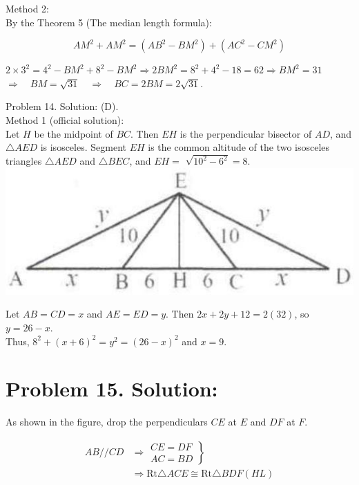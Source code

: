 \documentclass[10pt]{article}
\begin{document}
Method 2:\\
By the Theorem 5 (The median length formula):

\[
A M^{2}+A M^{2}=\left(A B^{2}-B M^{2}\right)+\left(A C^{2}-C M^{2}\right)
\]

\(2 \times 3^{2}=4^{2}-B M^{2}+8^{2}-B M^{2} \Rightarrow 2 B M^{2}=8^{2}+4^{2}-18=62 \Rightarrow B M^{2}=31\) \(\Rightarrow \quad B M=\sqrt{31} \quad \Rightarrow \quad B C=2 B M=2 \sqrt{31}\).

Problem 14. Solution: (D).\\
Method 1 (official solution):\\
Let \(H\) be the midpoint of \(B C\). Then \(E H\) is the perpendicular bisector of \(A D\), and \(\triangle A E D\) is isosceles. Segment \(E H\) is the common altitude of the two isosceles triangles \(\triangle A E D\) and \(\triangle B E C\), and \(E H=\) \(\sqrt{10^{2}-6^{2}}=8\).\\
\includegraphics[max width=\textwidth, center]{2025_04_17_97bc1f7e44d93c271a88g-097(2)}

Let \(A B=C D=x\) and \(A E=E D=y\). Then \(2 x+2 y+12=2(32)\), so \(y=26-x\).\\
Thus, \(8^{2}+(x+6)^{2}=y^{2}=(26-x)^{2}\) and \(x=9\).

\section*{Problem 15. Solution:}
As shown in the figure, drop the perpendiculars \(C E\) at \(E\) and \(D F\) at \(F\).

\[
\begin{aligned}
A B / / C D & \left.\Rightarrow \begin{array}{l}
C E=D F \\
A C=B D
\end{array}\right\} \\
& \Rightarrow \mathrm{Rt} \triangle A C E \cong \mathrm{Rt} \triangle B D F(H L)
\end{aligned}
\]
\end{document}
